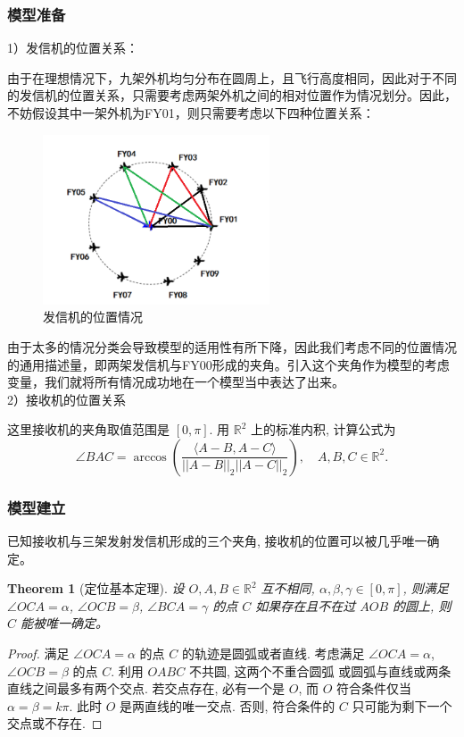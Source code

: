 \documentclass{my_paper}
\newcommand{\R}{\mathbb{R}}
\newtheorem{theorem}{Theorem}
\begin{document}
\subsubsection{模型准备}
1）发信机的位置关系：

由于在理想情况下，九架外机均匀分布在圆周上，且飞行高度相同，因此对于不同的发信机的位置关系，只需要考虑两架外机之间的相对位置作为情况划分。因此，不妨假设其中一架外机为FY01，则只需要考虑以下四种位置关系：

\begin{figure}[H]
    \centering
    \includegraphics[width=0.6\textwidth]{pic1.png}
    \caption{发信机的位置情况} 
\end{figure}

由于太多的情况分类会导致模型的适用性有所下降，因此我们考虑不同的位置情况的通用描述量，即两架发信机与FY00形成的夹角。引入这个夹角作为模型的考虑变量，我们就将所有情况成功地在一个模型当中表达了出来。\\

2）接收机的位置关系

这里接收机的夹角取值范围是 $[0,\pi]$. 用 $\R^2$ 上的标准内积, 计算公式为
$$
    \angle BAC = \arccos (\frac{\langle A-B,A-C\rangle}{||A-B||_2||A-C||_2}),\quad A,B,C\in \R^2.
$$


\subsubsection{模型建立}

已知接收机与三架发射发信机形成的三个夹角, 接收机的位置可以被几乎唯一确定。
\begin{theorem}[定位基本定理]
    设 $O,A,B\in\R^2$ 互不相同, $\alpha,\beta,\gamma\in[0,\pi]$, 则满足 $\angle OCA = \alpha$, $\angle OCB = \beta$, $\angle BCA = \gamma$ 的点 $C$ 
    如果存在且不在过 $AOB$ 的圆上, 则 $C$ 能被唯一确定。
\end{theorem}
\begin{proof}
    满足 $\angle OCA = \alpha$ 的点 $C$ 的轨迹是圆弧或者直线. 考虑满足 $\angle OCA = \alpha$, $\angle OCB = \beta$ 的点 $C$. 
    利用 $OABC$ 不共圆, 这两个不重合圆弧
    或圆弧与直线或两条直线之间最多有两个交点. 若交点存在, 必有一个是 $O$, 而 $O$ 符合条件仅当 $\alpha=\beta=k\pi$. 
    此时 $O$ 是两直线的唯一交点. 否则, 符合条件的 $C$ 只可能为剩下一个交点或不存在. 
\end{proof}
\end{document}
